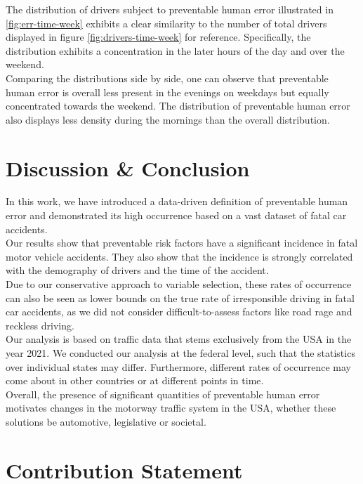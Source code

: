 \documentclass{article}
\theoremstyle{plain}
\theoremstyle{definition}
\theoremstyle{remark}
\begin{document}
\hfill \break
The distribution of drivers subject to preventable human error illustrated in \ref{fig:err-time-week} exhibits a clear similarity to the number of total drivers displayed in figure \ref{fig:drivers-time-week} for reference. Specifically, the distribution exhibits a concentration in the later hours of the day and over the weekend.\\
Comparing the distributions side by side, one can observe that preventable human error is overall less present in the evenings on weekdays but equally concentrated towards the weekend. The distribution of preventable human error also displays less density during the mornings than the overall distribution.
\section{Discussion \& Conclusion}\label{sec:conclusion}

In this work, we have introduced a data-driven definition of preventable human error and demonstrated its high occurrence based on a vast dataset of fatal car accidents.
\\
Our results show that preventable risk factors have a significant incidence in fatal motor vehicle accidents. They also show that the incidence is strongly correlated with the demography of drivers and the time of the accident.
\\
Due to our conservative approach to variable selection, these rates of occurrence can also be seen as lower bounds on the true rate of irresponsible driving in fatal car accidents, as we did not consider difficult-to-assess factors like road rage and reckless driving.
\\
Our analysis is based on traffic data that stems exclusively from the USA in the year 2021. We conducted our analysis at the federal level, such that the statistics over individual states may differ. Furthermore, different rates of occurrence may come about in other countries or at different points in time.
\\
Overall, the presence of significant quantities of preventable human error motivates changes in the motorway traffic system in the USA, whether these solutions be automotive, legislative or societal. 


\section*{Contribution Statement}
\end{document}

